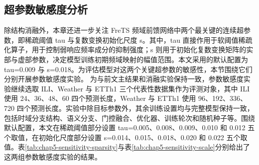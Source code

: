 \subsection{超参数敏感度分析}
除结构消融外，本章还进一步关注 FreTS 频域前馈网络中两个最关键的连续超参数，即稀疏阈值 tau 与复数变换初始化尺度 s。其中，tau 直接作用于软阈值稀疏化算子，用于控制弱响应频率成分的抑制强度；s 则用于初始化复数变换矩阵的实部与虚部参数，决定模型训练初期频域映射的幅值范围。本文采用的默认配置为 tau=0.009 与 s=0.018。为评估模型对这两个关键超参数的敏感性，本节围绕它们分别开展参数敏感度实验。 为与前文主结果和消融实验保持一致，参数敏感度实验继续选取 ILI、Weather 与 ETTh1 三个代表性数据集作为评测对象，其中 ILI 使用 24、36、48、60 四个预测长度，Weather 与 ETTh1 使用 96、192、336、720 四个预测长度。实验中除目标参数外，其余训练设置均与完整模型保持一致，包括时域分支结构、语义分支、门控融合、优化器、训练轮次和随机种子等。围绕默认配置，本文在稀疏阈值部分设置 tau=0.005、0.008、0.009、0.010 和 0.012 五个取值，在初始化尺度部分设置 s=0.014、0.015、0.018、0.020 和 0.022 五个取值。表\ref{tab:chap5-sensitivity-sparsity}与表\ref{tab:chap5-sensitivity-scale}分别给出了这两组参数敏感度实验的结果。 \begin{table}[!htbp]
\centering
\small
\setlength{\tabcolsep}{3.6pt}
\renewcommand{\arraystretch}{0.96}
\label{tab:chap5-sensitivity-sparsity}
\end{table}
